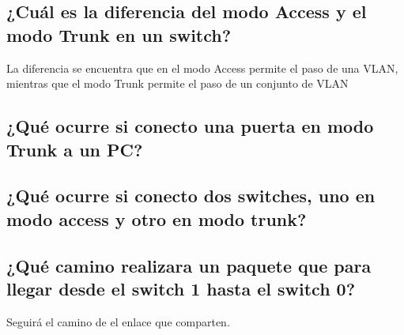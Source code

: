 \documentclass[spanish]{udpreport}
\begin{document}
\subsection{¿Cuál es la diferencia del modo Access y el modo Trunk en un switch?}
La diferencia se encuentra que en el modo Access permite el paso de una VLAN, mientras que el modo Trunk permite el paso de un conjunto de VLAN

\subsection{¿Qué ocurre si conecto una puerta en modo Trunk a un PC?}

\subsection{¿Qué ocurre si conecto dos switches, uno en modo access y otro en modo trunk?}

\subsection{¿Qué camino realizara un paquete que para llegar desde el switch 1 hasta el
switch 0?}

Seguirá el camino de el enlace que comparten.


\listoffigures
\end{document}
